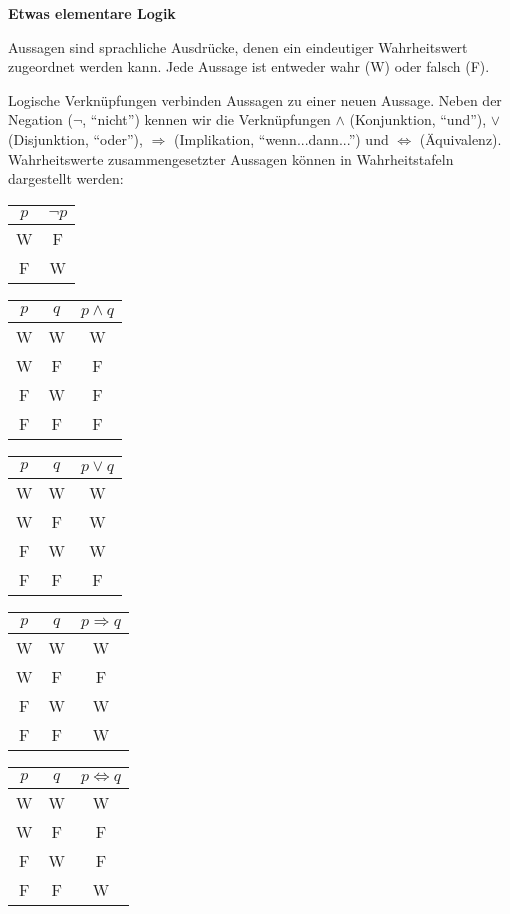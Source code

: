 \documentclass[a4paper,10pt]{article}
\title{\vskip-5ex Zusammenfassung zum Thema Mengen und Zahlen}
\author{Mathematischer Brückenkurs (B)\\für Naturwissenschaftler:innen}
\date{WS 2023/2024}
\begin{document}
\parindent0pt
\maketitle

{\bf Etwas elementare Logik}

Aussagen sind sprachliche Ausdrücke, denen ein eindeutiger Wahrheitswert zugeordnet werden kann. Jede Aussage ist entweder wahr (W) oder falsch (F).

Logische Verknüpfungen verbinden Aussagen zu einer neuen Aussage. Neben der Negation ($\neg$, ``nicht'') kennen wir die Verknüpfungen $\wedge$ (Konjunktion, ``und''), $\vee$ (Disjunktion, ``oder''), $\Rightarrow$ (Implikation, ``wenn...dann...'') und $\Leftrightarrow$ (Äquivalenz). Wahrheitswerte zusammengesetzter Aussagen können in Wahrheitstafeln dargestellt werden:

\begin{center}
{\begin{tabular}{c|c}$p$&$\neg p$\\\hline W&F\\F&W\end{tabular}}\hfil
{\begin{tabular}{cc|c}$p$&$q$&$p\wedge q$\\\hline W&W&W\\W&F&F\\F&W&F\\F&F&F\end{tabular}}\hfil
{\begin{tabular}{cc|c}$p$&$q$&$p\vee q$\\\hline W&W&W\\W&F&W\\F&W&W\\F&F&F\end{tabular}}\hfil
{\begin{tabular}{cc|c}$p$&$q$&$p\Rightarrow q$\\\hline W&W&W\\W&F&F\\F&W&W\\F&F&W\end{tabular}}{\relax}\hfil
{\begin{tabular}{cc|c}$p$&$q$&$p\Leftrightarrow q$\\\hline W&W&W\\W&F&F\\F&W&F\\F&F&W\end{tabular}}{\relax}
\end{center}
\end{document}
